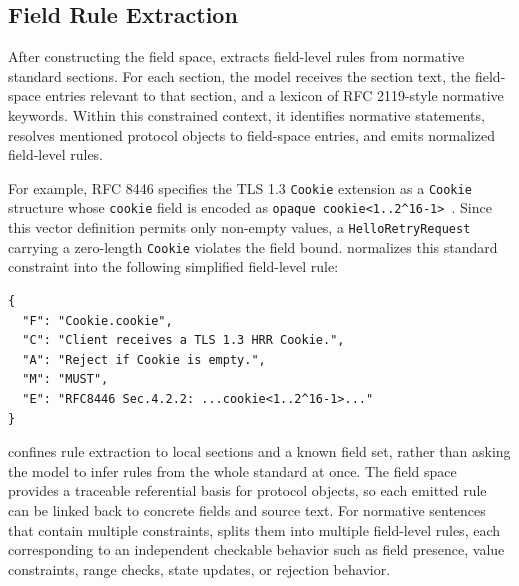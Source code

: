 \subsection{Field Rule Extraction}
\label{sec:rules}

After constructing the field space, \tool{} extracts field-level rules from
normative standard sections. For each section, the model receives the section
text, the field-space entries relevant to that section, and a lexicon of RFC
2119-style normative keywords. Within this constrained context, it identifies
normative statements, resolves mentioned protocol objects to field-space
entries, and emits normalized field-level rules.

For example, RFC 8446 specifies the TLS 1.3 \texttt{Cookie} extension as a
\texttt{Cookie} structure whose \texttt{cookie} field is encoded as
\texttt{opaque cookie<1..2\^{}16-1>}~\cite{rfc8446}. Since this vector
definition permits only non-empty values, a \texttt{HelloRetryRequest}
carrying a zero-length \texttt{Cookie} violates the field bound. \tool{}
normalizes this standard constraint into the following simplified field-level
rule:
\begin{lstlisting}[style=jsonsnippet]
{
  "F": "Cookie.cookie",
  "C": "Client receives a TLS 1.3 HRR Cookie.",
  "A": "Reject if Cookie is empty.",
  "M": "MUST",
  "E": "RFC8446 Sec.4.2.2: ...cookie<1..2^16-1>..."
}
\end{lstlisting}


\tool{} confines rule extraction to local sections and a known field set,
rather than asking the model to infer rules from the whole standard at once.
The field space provides a traceable referential basis for protocol objects, so
each emitted rule can be linked back to concrete fields and source text. For
normative sentences that contain multiple constraints, \tool{} splits them into
multiple field-level rules, each corresponding to an independent checkable
behavior such as field presence, value constraints, range checks, state
updates, or rejection behavior.

